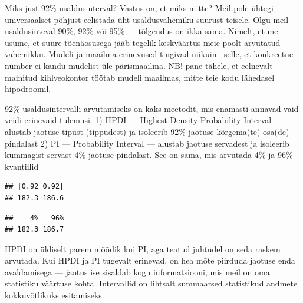 \documentclass[]{book}
\newenvironment{Shaded}{\begin{snugshade}}{\end{snugshade}}
\newcommand{\KeywordTok}[1]{\textcolor[rgb]{0.13,0.29,0.53}{\textbf{#1}}}
\newcommand{\DataTypeTok}[1]{\textcolor[rgb]{0.13,0.29,0.53}{#1}}
\newcommand{\FloatTok}[1]{\textcolor[rgb]{0.00,0.00,0.81}{#1}}
\newcommand{\CommentTok}[1]{\textcolor[rgb]{0.56,0.35,0.01}{\textit{#1}}}
\newcommand{\OperatorTok}[1]{\textcolor[rgb]{0.81,0.36,0.00}{\textbf{#1}}}
\newcommand{\NormalTok}[1]{#1}
\begin{document}
Miks just 92\% usaldusinterval? Vastus on, et miks mitte? Meil pole
ühtegi universaalset põhjust eelistada üht usaldusvahemiku suurust
teisele. Olgu meil usaldusinteval 90\%, 92\% või 95\% --- tõlgendus on
ikka sama. Nimelt, et me usume, et suure tõenäosusega jääb tegelik
keskväärtus meie poolt arvutatud vahemikku. Mudeli ja maailma erinevused
tingivad niikuinii selle, et konkreetne number ei kandu mudelist üle
pärismaailma. NB! pane tähele, et eelnevalt mainitud kihlveokontor
töötab mudeli maailmas, mitte teie kodu lähedasel hipodroomil.

92\% usaldusintervalli arvutamiseks on kaks meetodit, mis enamasti
annavad vaid veidi erinevaid tulemusi. 1) HPDI --- Highest Density
Probability Interval --- alustab jaotuse tipust (tippudest) ja isoleerib
92\% jaotuse kõrgema(te) osa(de) pindalast 2) PI --- Probability
Interval --- alustab jaotuse servadest ja isoleerib kummagist servast
4\% jaotuse pindalast. See on sama, mis arvutada 4\% ja 96\% kvantiilid

\begin{Shaded}
\end{Shaded}

\begin{verbatim}
## |0.92 0.92| 
## 182.3 186.6
\end{verbatim}

\begin{Shaded}
\end{Shaded}

\begin{verbatim}
##    4%   96% 
## 182.3 186.7
\end{verbatim}

HPDI on üldiselt parem mõõdik kui PI, aga teatud juhtudel on seda raskem
arvutada. Kui HPDI ja PI tugevalt erinevad, on hea mõte piirduda jaotuse
enda avaldamisega --- jaotus ise sisaldab kogu informatsiooni, mis meil
on oma statistiku väärtuse kohta. Intervallid on lihtsalt summaarsed
statistikud andmete kokkuvõtlikuks esitamiseks.
\end{document}
